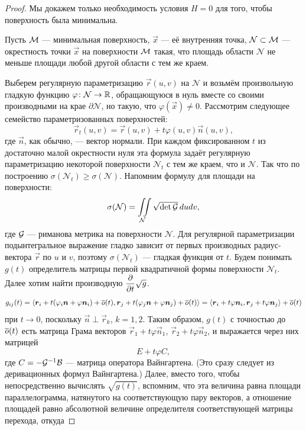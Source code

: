 \begin{proof}
	Мы докажем только необходимость условия $H = 0$ для того, чтобы поверхность была минимальна.

	Пусть $\mathcal{M}$ --- минимальная поверхность, $\vec{x}$ --- её внутренняя точка, $\mathcal{N} \subset \mathcal{M}$ --- окрестность точки $\vec{x}$ на поверхности $\mathcal{M}$ такая, что площадь области $\mathcal{N}$ не меньше площади любой другой области с тем же краем.

	Выберем регулярную параметризацию $\vec{r}(u, v)$ на $\mathcal{N}$ и возьмём произвольную гладкую функцию $\varphi\colon \mathcal{N} \to \mathbb{R}$, обращающуюся в нуль вместе со своими производными на крае $\partial\mathcal{N}$, но такую, что $\varphi(\vec{x}) \ne 0$. Рассмотрим следующее семейство параметризованных поверхностей:
	\[
		\vec{r}_t(u, v) = \vec{r}(u, v) + t\varphi(u, v)\vec{n}(u, v),
	\]
	где $\vec{n}$, как обычно, --- вектор нормали. При каждом фиксированном $t$ из достаточно малой окрестности нуля эта формула задаёт регулярную параметризацию некоторой поверхности $\mathcal{N}_t$ с тем же краем, что и $\mathcal{N}$. Так что по построению $\sigma(\mathcal{N}_t) \geqslant \sigma(\mathcal{N})$. Напомним формулу для площади на поверхности:
	\[
		\sigma(\mathcal{N}) = \iint\limits_{\mathcal{N}}\sqrt{\det\mathcal{G}}\,dudv,
	\]
	где $\mathcal{G}$ --- риманова метрика на поверхности $\mathcal{N}$. Для регулярной параметризации подынтегральное выражение гладко зависит от первых производных радиус-вектора $\vec{r}$ по $u$ и $v$, поэтому $\sigma(\mathcal{N}_t)$ --- гладкая функция от $t$. Будем понимать $g(t)$ определитель матрицы первой квадратичной формы поверхности $\mathcal{N}_t$. Далее хотим найти производную $\displaystyle\frac{\partial}{\partial t}\sqrt{g}$.
	\[
		g_{ij}(t) = \langle\boldsymbol{r}_i + t(\varphi_i\boldsymbol{n} + \varphi\boldsymbol{n}_i) + \overline{o}(t), \boldsymbol{r}_j + t(\varphi_j\boldsymbol{n} + \varphi\boldsymbol{n}_j) + \overline{o}(t)\rangle = \langle\boldsymbol{r}_i + t\varphi\boldsymbol{n}_i, \boldsymbol{r}_j + t\varphi\boldsymbol{n}_j\rangle + \overline{o}(t)
	\]
	при $t \to 0$, поскольку $\vec{n} \perp \vec{r}_k$, $k = 1, 2$. Таким образом, $g(t)$ с точностью до $\overline{o}(t)$ есть матрица Грама векторов $\vec{r}_1 + t\varphi\vec{n}_1$, $\vec{r}_2 + t\varphi\vec{n}_2$, и выражается через них матрицей
	\[
		E + t\varphi C,
	\]
	где $C = -\mathcal{G}^{-1}\mathcal{B}$ --- матрица оператора Вайнгартена. (Это сразу следует из деривационных формул Вайнгартена.) Далее, вместо того, чтобы непосредственно вычислять $\sqrt{g(t)}$, вспомним, что эта величина равна площади параллелограмма, натянутого на соответствующую пару векторов, а отношение площадей равно абсолютной величине определителя соответствующей матрицы перехода, откуда

\end{proof}
